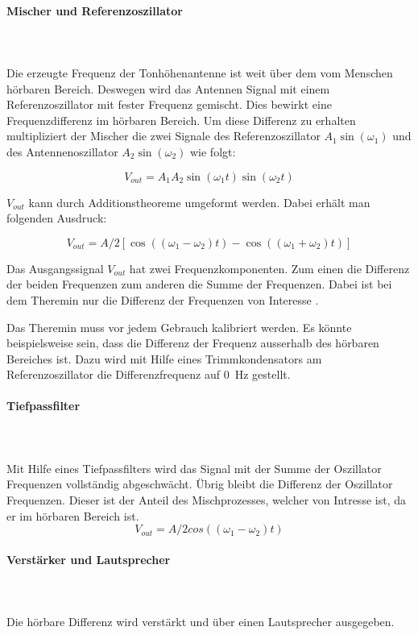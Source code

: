 \paragraph{Mischer und Referenzoszillator}\mbox{}\\ 
\\Die erzeugte Frequenz der Tonhöhenantenne ist weit über dem vom Menschen hörbaren Bereich. Deswegen wird das Antennen Signal mit einem Referenzoszillator mit fester Frequenz gemischt. Dies bewirkt eine Frequenzdifferenz im hörbaren Bereich.
Um diese Differenz zu erhalten multipliziert der Mischer die zwei Signale des Referenzoszillator $A_1\sin(\omega_1)$  und des Antennenoszillator $A_2\sin(\omega_2)$ wie folgt:

\begin{equation}
V_{out} = A_{1}A_{2} \sin(\omega_{1}t)   \sin(\omega_{2}t) 
\label{equ:mischer}
\end{equation}

$V_{out}$ kann durch Additionstheoreme umgeformt werden. Dabei erhält man folgenden Ausdruck:

\begin{equation}
V_{out} = A/2[\cos((\omega_{1}-\omega_{2})t)  - \cos((\omega_{1}+\omega_{2})t) ]
\label{equ:mischer_trigo}
\end{equation}

Das Ausgangssignal $V_{out}$ hat zwei Frequenzkomponenten. Zum einen die Differenz der beiden Frequenzen zum anderen die Summe der Frequenzen. Dabei ist bei dem Theremin nur die Differenz der Frequenzen von Interesse \cite{physik_theremin}.

Das Theremin muss vor jedem Gebrauch kalibriert werden. Es könnte beispielsweise sein, dass die Differenz der Frequenz ausserhalb des hörbaren Bereiches ist. Dazu wird mit Hilfe eines Trimmkondensators am Referenzoszillator die Differenzfrequenz auf \SI{0}{Hz} gestellt.

\paragraph{Tiefpassfilter}\mbox{}\\ 
\\Mit Hilfe eines Tiefpassfilters wird das Signal mit der Summe der Oszillator Frequenzen vollständig abgeschwächt. Übrig bleibt die Differenz der Oszillator Frequenzen. Dieser ist der Anteil des Mischprozesses, welcher von Intresse ist, da er im hörbaren Bereich ist.
\begin{equation}
V_{out} = A/2cos((\omega_{1}-\omega_{2})t) 
\label{equ:mischer_trigo}
\end{equation}

\paragraph{Verstärker und  Lautsprecher}\mbox{}\\ 
\\Die hörbare Differenz wird verstärkt und über einen Lautsprecher ausgegeben.
